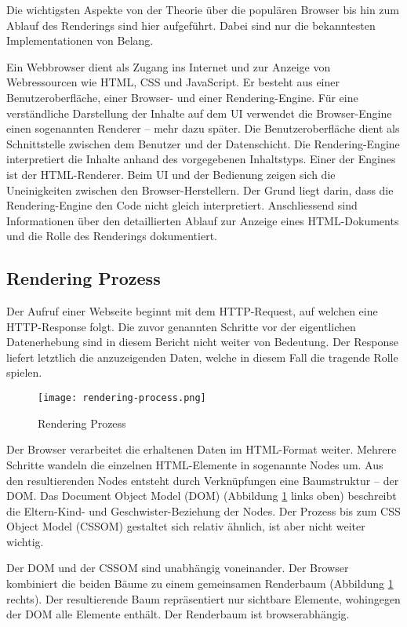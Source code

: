 Die wichtigsten Aspekte von der Theorie über die populären Browser bis hin zum Ablauf des Renderings sind hier aufgeführt. 
Dabei sind nur die bekanntesten Implementationen von Belang. 

Ein Webbrowser dient als Zugang ins Internet und zur Anzeige von Webressourcen wie HTML, CSS und JavaScript. 
Er besteht aus einer Benutzeroberfläche, einer Browser- und einer Rendering-Engine. 
Für eine verständliche Darstellung der Inhalte auf dem UI verwendet die Browser-Engine einen sogenannten Renderer – mehr dazu später. 
Die Benutzeroberfläche dient als Schnittstelle zwischen dem Benutzer und der Datenschicht. 
Die Rendering-Engine interpretiert die Inhalte anhand des vorgegebenen Inhaltstyps. 
Einer der Engines ist der HTML-Renderer. 
Beim UI und der Bedienung zeigen sich die Uneinigkeiten zwischen den Browser-Herstellern. 
Der Grund liegt darin, dass die Rendering-Engine den Code nicht gleich interpretiert. 
Anschliessend sind Informationen über den detaillierten Ablauf zur Anzeige eines HTML-Dokuments und die Rolle des Renderings dokumentiert. 


\subsection{Rendering Prozess}
\label{sec:structureRendering}

Der Aufruf einer Webseite beginnt mit dem HTTP-Request, auf welchen eine HTTP-Response folgt.
Die zuvor genannten Schritte vor der eigentlichen Datenerhebung sind in diesem Bericht nicht weiter von Bedeutung.
Der Response liefert letztlich die anzuzeigenden Daten, welche in diesem Fall die tragende Rolle spielen.

\begin{figure}[!htb]
    \centering
    \texttt{[image: rendering-process.png]}
    \caption{\centering Rendering Prozess}
    \label{img:renderingProcess}
\end{figure}

Der Browser verarbeitet die erhaltenen Daten im HTML-Format weiter. 
Mehrere Schritte wandeln die einzelnen HTML-Elemente in sogenannte Nodes um. 
Aus den resultierenden Nodes entsteht durch Verknüpfungen eine Baumstruktur – der DOM. 
Das Document Object Model (DOM) (Abbildung \ref{img:renderingProcess} links oben) beschreibt die Eltern-Kind- und Geschwister-Beziehung der Nodes. 
Der Prozess bis zum CSS Object Model (CSSOM) gestaltet sich relativ ähnlich, ist aber nicht weiter wichtig. 

Der DOM und der CSSOM sind unabhängig voneinander.
Der Browser kombiniert die beiden Bäume zu einem gemeinsamen Renderbaum (Abbildung \ref{img:renderingProcess} rechts). 
Der resultierende Baum repräsentiert nur sichtbare Elemente, wohingegen der DOM alle Elemente enthält. 
Der Renderbaum ist browserabhängig. 

